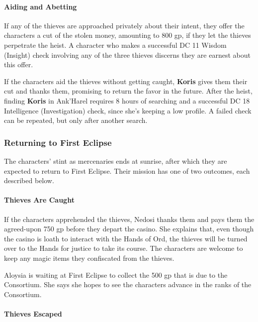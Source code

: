 \documentclass[letterpaper, 11pt, bg=full, twocolumn]{dndbook}
\begin{document}

\paragraph{Aiding and Abetting}

If any of the thieves are approached privately about their intent, they offer the characters a cut of the stolen money, amounting to 800 gp, if they let the thieves perpetrate the heist. A character who makes a successful DC 11 Wisdom (Insight) check involving any of the three thieves discerns they are earnest about this offer.

If the characters aid the thieves without getting caught, \textbf{Koris} gives them their cut and thanks them, promising to return the favor in the future. After the heist, finding \textbf{Koris} in Ank'Harel requires 8 hours of searching and a successful DC 18 Intelligence (Investigation) check, since she's keeping a low profile. A failed check can be repeated, but only after another search.

\subsubsection{Returning to First Eclipse}

The characters' stint as mercenaries ends at sunrise, after which they are expected to return to First Eclipse. Their mission has one of two outcomes, each described below.

\paragraph{Thieves Are Caught}

If the characters apprehended the thieves, Nedosi thanks them and pays them the agreed-upon 750 gp before they depart the casino. She explains that, even though the casino is loath to interact with the Hands of Ord, the thieves will be turned over to the Hands for justice to take its course. The characters are welcome to keep any magic items they confiscated from the thieves.

Aloysia is waiting at First Eclipse to collect the 500 gp that is due to the Consortium. She says she hopes to see the characters advance in the ranks of the Consortium.

\paragraph{Thieves Escaped}
\end{document}
